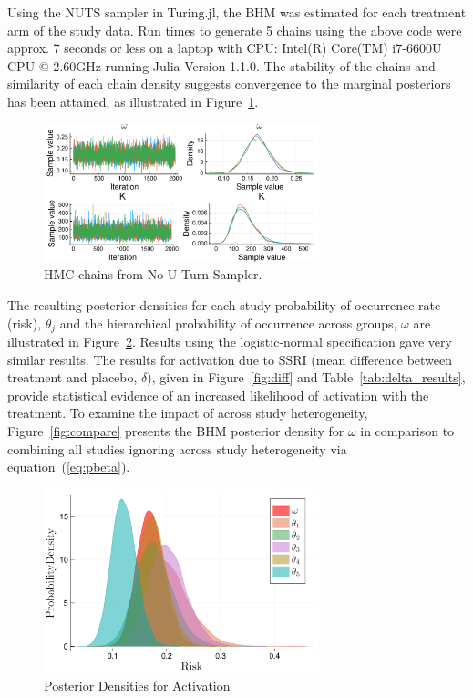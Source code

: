 \documentclass{juliacon}
\begin{document}
Using the NUTS sampler in Turing.jl, the BHM was estimated for each treatment arm of the study data. Run times to generate 5 chains using the above code were approx. 7 seconds or less on a laptop with CPU: Intel(R) Core(TM) i7-6600U CPU @ 2.60GHz running Julia Version 1.1.0. The stability of the chains and similarity of each chain density suggests convergence to the marginal posteriors has been attained, as illustrated in Figure~\ref{fig:chains}.
\begin{figure}[t]
	\centerline{\includegraphics[width=8cm]{omega_K_mcmcplot.pdf}}
	\caption{HMC chains from No U-Turn Sampler.}
	\label{fig:chains}
	\end{figure}

The resulting posterior densities for each study probability of occurrence rate (risk), $\theta_j$ and the hierarchical probability of occurrence across groups, $\omega$ are illustrated in Figure~\ref{fig:activ}. Results using the logistic-normal specification gave very similar results. The results for activation due to SSRI (mean difference between treatment and placebo, $\delta$), given in Figure~\ref{fig:diff} and Table~\ref{tab:delta_results}, provide statistical evidence of an increased likelihood of activation with the treatment. To examine the impact of across study heterogeneity, Figure~\ref{fig:compare} presents the BHM posterior density for $\omega$ in comparison to combining all studies ignoring across study heterogeneity via equation~(\ref{eq:pbeta}).

\begin{figure}[t]
	\centerline{\includegraphics[width=8cm]{thetas_omega.pdf}}
	\caption{Posterior Densities for Activation}
	\label{fig:activ}
\end{figure}
\end{document}
